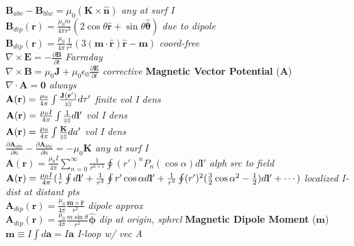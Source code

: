 \documentclass[9pt]{extarticle}
\def\rcurs{{\mbox{$\resizebox{.09in}{.08in}{\texttt{[image: ScriptR]}}$}}}
\begin{document}
\begin{multicols}{3}
$\mathbf{B}_{abv} - \mathbf{B}_{blw} = \mu_{0}(\mathbf{K}\times\mathbf{\hat{n}})$ \textit{any at surf I} \\
$\mathbf{B}_{dip}(\mathbf{r}) = \frac{\mu_{0}m}{4\pi r^{3}}(2\cos{\theta}\mathbf{\hat{r}} + \sin{\theta}\mathbf{\hat{\theta}})$ \textit{due to dipole} \\
$\mathbf{B}_{dip}(\mathbf{r}) = \frac{\mu_{0}}{4\pi}\frac{1}{r^{3}}(3(\mathbf{m}\cdot\mathbf{\hat{r}})\mathbf{\hat{r}}-\mathbf{m})$ \textit{coord-free} \\
$\nabla\times\mathbf{E} = -\frac{\partial\mathbf{B}}{\partial t}$ \textit{Farraday} \\
$\nabla\times\mathbf{B}=\mu_{0}\mathbf{J}+\mu_{0}\epsilon_{0}\frac{\partial\mathbf{E}}{\partial t}$ \textit{corrective}
\textbf{Magnetic Vector Potential} ($\mathbf{A}$) \\
$\nabla\cdot\mathbf{A} = \mathbf{0}$ \textit{always} \\
$\mathbf{A}(\mathbf{r}) = \frac{\mu_{0}}{4\pi}\int\frac{\mathbf{J}(\mathbf{r}')}{\rcurs}d\tau '$ \textit{finite vol I dens} \\
$\mathbf{A}(\mathbf{r}) = \frac{\mu_{0}I}{4\pi}\int\frac{1}{\rcurs}d\mathbf{l}'$ \textit{vol I dens} \\
$\mathbf{A}(\mathbf{r}) = \frac{\mu_{0}}{4\pi}\int\frac{\mathbf{K}}{\rcurs}da '$ \textit{vol I dens} \\
$\frac{\partial\mathbf{A}_{abv}}{\partial n} - \frac{\partial\mathbf{A}_{blw}}{\partial n} = -\mu_{0}\mathbf{K}$ \textit{any at surf I} \\
$\mathbf{A}(\mathbf{r}) = \frac{\mu_{0}I}{4\pi}\sum_{n=0}^{\infty}\frac{1}{r^{n+1}}\oint(r')^{n}P_{n}(\cos{\alpha})d\mathbf{l}'$ \textit{alph src to field} \\
$\mathbf{A}(\mathbf{r}) = \frac{\mu_{0}I}{4\pi}(\frac{1}{r}\oint d\mathbf{l}' + \frac{1}{r^{2}} \oint r'\cos{\alpha}d\mathbf{l}' \\ + \frac{1}{r^{3}}\oint (r')^{2}(\frac{3}{2}\cos{\alpha}^{2}-\frac{1}{2})d\mathbf{l}' + \cdots)$ \textit{localized I-dist at distant pts} \\
$\mathbf{A}_{dip}(\mathbf{r}) = \frac{\mu_{0}}{4\pi}\frac{\mathbf{m}\times\mathbf{\hat{r}}}{r^{2}}$ \textit{dipole approx} \\
$\mathbf{A}_{dip}(\mathbf{r}) = \frac{\mu_{0}}{4\pi}\frac{m\sin{\theta}}{r^{2}}\mathbf{\hat{\phi}}$ \textit{dip at origin, sphrcl}
\textbf{Magnetic Dipole Moment} ($\mathbf{m}$) \\
$\mathbf{m} \equiv I\int d\mathbf{a} = I\mathbf{a}$ \textit{I-loop w/ vec A} \\

\end{multicols}
\end{document}
